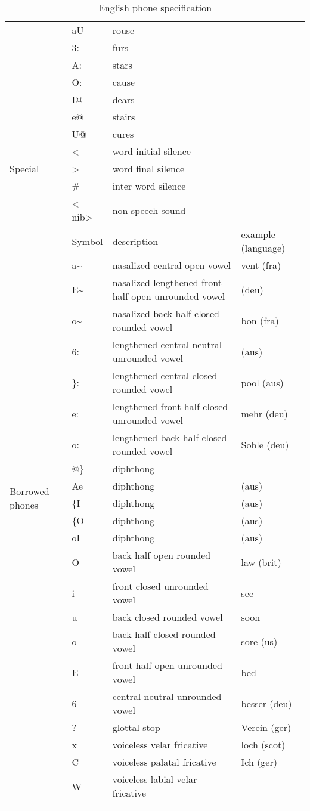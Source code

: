 {\begin{longtable}{l|l|p{.3\linewidth}|l}
	& aU & rouse &\\
	& 3: & furs &\\
	& A:\ & stars &\\
	& O:\ & cause &\\
	& I@ & dears &\\
	& e@ & stairs &\\
	& U@ & cures &\\
	\midrule
	\multirow{3}{*}{Special} &
	\textless{} & word initial silence & \\
	& \textgreater{} & word final silence & \\
	& \# & inter word silence & \\
	& \textless{} nib\textgreater{} & non speech sound & \\
	\midrule\midrule
	\multirow{22}{*}{Borrowed phones} & Symbol & description &
		example (language)\\
	\midrule
	& a\textasciitilde{} & 
		nasalized central open vowel & vent (fra)\\
	& E\textasciitilde{} & 
		nasalized lengthened front half open unrounded vowel & (deu)\\
	& o\textasciitilde{} & 
		nasalized back half closed rounded vowel & bon (fra)\\
	& 6:\ & lengthened central neutral unrounded vowel & (aus)\\
	& \}:\ & lengthened central closed rounded vowel & pool (aus)\\
	& e:\ & lengthened front half closed unrounded vowel & mehr (deu)\\
	& o:\ & lengthened back half closed rounded vowel & Sohle (deu)\\
	& @\} & diphthong &\\
	& Ae & diphthong & (aus)\\
	& \{I & diphthong & (aus)\\
	& \{O & diphthong & (aus)\\
	& oI & diphthong & (aus)\\
	& O & back half open rounded vowel & law (brit)\\
	& i & front closed unrounded vowel & see\\
	& u & back closed rounded vowel & soon\\
	& o & back half closed rounded vowel & sore (us)\\
	& E & front half open unrounded vowel & bed\\
	& 6 & central neutral unrounded vowel & besser (deu)\\
	&? & glottal stop & Verein (ger)\\
	& x & voiceless velar fricative & loch (scot)\\
	& C & voiceless palatal fricative & Ich (ger)\\
	& W & voiceless labial-velar fricative &\\
	\bottomrule
	\caption{English phone specification}
\end{longtable}
}

